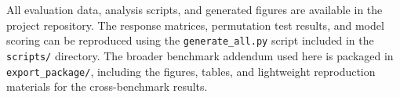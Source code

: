\documentclass[11pt, letterpaper]{article}
\begin{document}
All evaluation data, analysis scripts, and generated figures are available in the project repository. The response matrices, permutation test results, and model scoring can be reproduced using the \texttt{generate\_all.py} script included in the \texttt{scripts/} directory. The broader benchmark addendum used here is packaged in \texttt{export\_package/}, including the figures, tables, and lightweight reproduction materials for the cross-benchmark results.

\end{document}
